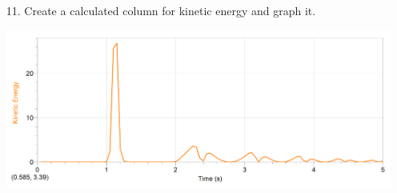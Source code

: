 \documentclass[12pt, letterpaper]{article}
\begin{document}
\begin{enumerate}
        \item[11.] Create a calculated column for kinetic energy and graph it.
        
        \begin{mdframed}
            \begin{center}
                \includegraphics[width=\textwidth]{image1.png}
            \end{center}
        \end{mdframed}
    \end{enumerate}
\end{document}
